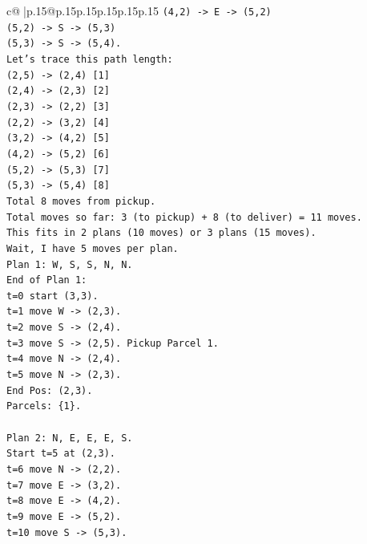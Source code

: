 \documentclass{article}
\begin{document}
{\begin{supertabular}{c@{$\;$}|p{.15\linewidth}@{}p{.15\linewidth}p{.15\linewidth}p{.15\linewidth}p{.15\linewidth}p{.15\linewidth}}
{{{\texttt{(4,2) {-}> E {-}> (5,2)} \\
\texttt{(5,2) {-}> S {-}> (5,3)} \\
\texttt{(5,3) {-}> S {-}> (5,4).} \\
\texttt{Let's trace this path length:} \\
\texttt{(2,5) {-}> (2,4) {[}1{]}} \\
\texttt{(2,4) {-}> (2,3) {[}2{]}} \\
\texttt{(2,3) {-}> (2,2) {[}3{]}} \\
\texttt{(2,2) {-}> (3,2) {[}4{]}} \\
\texttt{(3,2) {-}> (4,2) {[}5{]}} \\
\texttt{(4,2) {-}> (5,2) {[}6{]}} \\
\texttt{(5,2) {-}> (5,3) {[}7{]}} \\
\texttt{(5,3) {-}> (5,4) {[}8{]}} \\
\texttt{Total 8 moves from pickup.} \\
\texttt{Total moves so far: 3 (to pickup) + 8 (to deliver) = 11 moves.} \\
\texttt{This fits in 2 plans (10 moves) or 3 plans (15 moves).} \\
\texttt{Wait, I have 5 moves per plan.} \\
\texttt{Plan 1: W, S, S, N, N.} \\
\texttt{End of Plan 1:} \\
\texttt{t=0 start (3,3).} \\
\texttt{t=1 move W {-}> (2,3).} \\
\texttt{t=2 move S {-}> (2,4).} \\
\texttt{t=3 move S {-}> (2,5). Pickup Parcel 1.} \\
\texttt{t=4 move N {-}> (2,4).} \\
\texttt{t=5 move N {-}> (2,3).} \\
\texttt{End Pos: (2,3).} \\
\texttt{Parcels: \{1\}.} \\
\\ 
\texttt{Plan 2: N, E, E, E, S.} \\
\texttt{Start t=5 at (2,3).} \\
\texttt{t=6 move N {-}> (2,2).} \\
\texttt{t=7 move E {-}> (3,2).} \\
\texttt{t=8 move E {-}> (4,2).} \\
\texttt{t=9 move E {-}> (5,2).} \\
\texttt{t=10 move S {-}> (5,3).} \\
}}}
\end{supertabular}}
\end{document}
